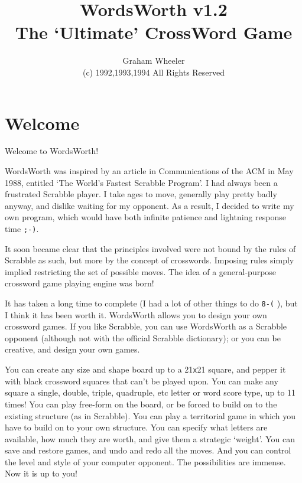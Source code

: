 
\title{WordsWorth v1.2\\The `Ultimate' CrossWord Game}
\author{Graham Wheeler\\(c) 1992,1993,1994  All Rights Reserved}
\maketitle
\tableofcontents

\section{Welcome}

Welcome to WordsWorth!

WordsWorth was inspired by an article in Communications of the 
ACM in May 1988, entitled `The World's Fastest Scrabble Program'.
I had always been a frustrated Scrabble player. I take ages to 
move, generally play pretty badly anyway, and dislike waiting
for my opponent. As a result, I decided to write my own program,
which would have both infinite patience and lightning response
time {\tt ;-)}. 

It soon became clear that the principles involved were not bound
by the rules of Scrabble as such, but more by the concept of crosswords.
Imposing rules simply implied restricting the set of possible moves.
The idea of a general-purpose crossword game playing engine was born!

It has taken a long time to complete (I had a lot of other things to
do {\tt 8-(} ), but I think it has been worth it. WordsWorth allows you
to design your own crossword games. If you like Scrabble, you
can use WordsWorth as a Scrabble opponent (although not with the
official Scrabble dictionary); or you can be creative, and design 
your own games.

You can create any size and shape board up to a 21{\tt x}21 square, and
pepper it with black crossword squares that can't be played upon.
You can make any square a single, double, triple, quadruple, etc
letter or word score type, up to 11 times! You can play free-form
on the board, or be forced to build on to the existing structure
(as in Scrabble). You can play a territorial game in which you have
to build on to your own structure. You can specify what letters are
available, how much they are worth, and give them a strategic `weight'.
You can save and restore games, and undo and redo all the moves.
And you can control the level and style of your computer opponent.
The possibilities are immense. Now it is up to you!

